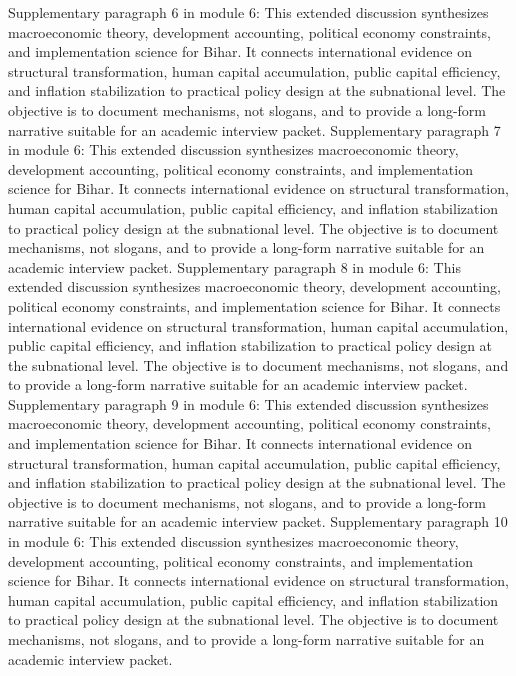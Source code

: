 \documentclass[preprint,12pt]{elsarticle}
\begin{document}
Supplementary paragraph 6 in module 6: This extended discussion synthesizes macroeconomic theory, development accounting, political economy constraints, and implementation science for Bihar. It connects international evidence on structural transformation, human capital accumulation, public capital efficiency, and inflation stabilization to practical policy design at the subnational level. The objective is to document mechanisms, not slogans, and to provide a long-form narrative suitable for an academic interview packet.
Supplementary paragraph 7 in module 6: This extended discussion synthesizes macroeconomic theory, development accounting, political economy constraints, and implementation science for Bihar. It connects international evidence on structural transformation, human capital accumulation, public capital efficiency, and inflation stabilization to practical policy design at the subnational level. The objective is to document mechanisms, not slogans, and to provide a long-form narrative suitable for an academic interview packet.
Supplementary paragraph 8 in module 6: This extended discussion synthesizes macroeconomic theory, development accounting, political economy constraints, and implementation science for Bihar. It connects international evidence on structural transformation, human capital accumulation, public capital efficiency, and inflation stabilization to practical policy design at the subnational level. The objective is to document mechanisms, not slogans, and to provide a long-form narrative suitable for an academic interview packet.
Supplementary paragraph 9 in module 6: This extended discussion synthesizes macroeconomic theory, development accounting, political economy constraints, and implementation science for Bihar. It connects international evidence on structural transformation, human capital accumulation, public capital efficiency, and inflation stabilization to practical policy design at the subnational level. The objective is to document mechanisms, not slogans, and to provide a long-form narrative suitable for an academic interview packet.
Supplementary paragraph 10 in module 6: This extended discussion synthesizes macroeconomic theory, development accounting, political economy constraints, and implementation science for Bihar. It connects international evidence on structural transformation, human capital accumulation, public capital efficiency, and inflation stabilization to practical policy design at the subnational level. The objective is to document mechanisms, not slogans, and to provide a long-form narrative suitable for an academic interview packet.
\end{document}
